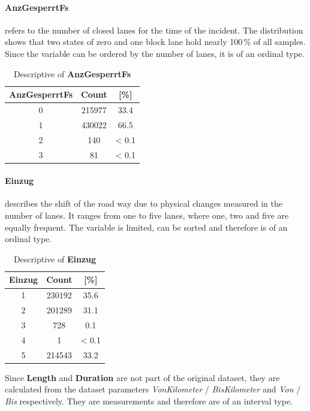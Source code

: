 \paragraph{AnzGesperrtFs} refers to the number of closed lanes for the time of the incident. The distribution shows that two states of zero and one block lane hold nearly 100\,\% of all samples. Since the variable can be ordered by the number of lanes, it is of an ordinal type.
\begin{table}[!ht]
	\centering
	\small
	\begin{tabular}{c|c|c} 
		\toprule
		\textbf{AnzGesperrtFs} & Count & [\%] \\ 
		\midrule
		0  & 215977	& 33.4  \\ 
		1  & 430022	& 66.5  \\	 
		2  & 140	& < 0.1 \\ 
		3  & 81	 	& < 0.1 \\
		\bottomrule
	\end{tabular}
	\caption{Descriptive of \textbf{AnzGesperrtFs}}
	\label{tbl:arbis_dataset_AnzGesperrtFs}
	\vspace{-8mm}
\end{table}

\paragraph{Einzug} describes the shift of the road way due to physical changes measured in the number of lanes. It ranges from one to five lanes, where one, two and five are equally frequent. The variable is limited, can be sorted and therefore is of an ordinal type.
\begin{table}[!ht]
	\centering
	\small
	\begin{tabular}{c|c|c} 
		\toprule
		\textbf{Einzug} & Count & [\%] \\ 
		\midrule
		1 & 230192 & 35.6  \\
		2 & 201289 & 31.1  \\ 
		3 & 728	   & 0.1   \\ 
		4 & 1	   & < 0.1 \\ 
		5 & 214543 & 33.2  \\
		\bottomrule
	\end{tabular}
	\caption{Descriptive of \textbf{Einzug}}
	\label{tbl:arbis_dataset_Einzug}
\end{table}

Since \textbf{Length} and \textbf{Duration} are not part of the original dataset, they are calculated from the dataset parameters \textit{VonKilometer} / \textit{BisKilometer} and \textit{Von} / \textit{Bis} respectively. They are measurements and therefore are of an interval type.

